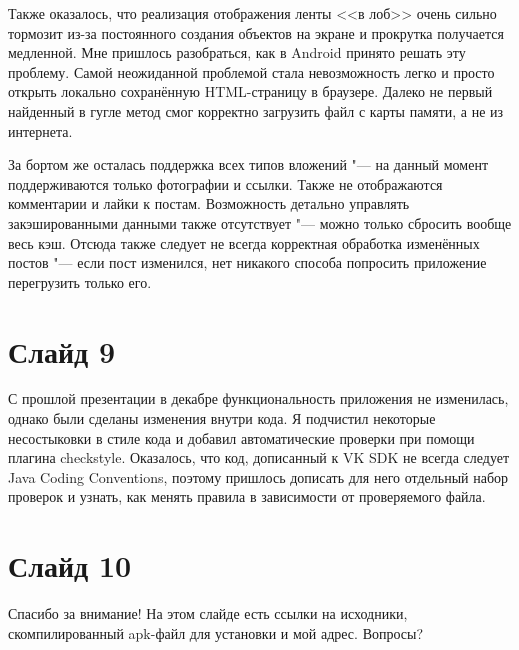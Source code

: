 \documentclass[a4paper]{article}
\begin{document}
Также оказалось, что реализация отображения ленты <<в лоб>> очень сильно тормозит из-за постоянного
создания объектов на экране и прокрутка получается медленной. Мне пришлось разобраться, как в Android принято решать эту проблему.
Самой неожиданной проблемой стала невозможность легко и просто открыть локально сохранённую HTML-страницу в браузере.
Далеко не первый найденный в гугле метод смог корректно загрузить файл с карты памяти, а не из интернета.

За бортом же осталась поддержка всех типов вложений "--- на данный момент поддерживаются только фотографии и ссылки.
Также не отображаются комментарии и лайки к постам.
Возможность детально управлять закэшированными данными также отсутствует "--- можно только сбросить вообще весь кэш.
Отсюда также следует не всегда корректная обработка изменённых постов "--- если пост изменился, нет никакого способа попросить
приложение перегрузить только его.

\section{Слайд 9}
С прошлой презентации в декабре функциональность приложения не изменилась, однако были сделаны изменения внутри кода.
Я подчистил некоторые несостыковки в стиле кода и добавил автоматические проверки при помощи плагина checkstyle.
Оказалось, что код, дописанный к VK SDK не всегда следует Java Coding Conventions, поэтому пришлось дописать для него
отдельный набор проверок и узнать, как менять правила в зависимости от проверяемого файла.

\section{Слайд 10}
Спасибо за внимание!
На этом слайде есть ссылки на исходники, скомпилированный apk-файл для установки и мой адрес.
Вопросы?
\end{document}
